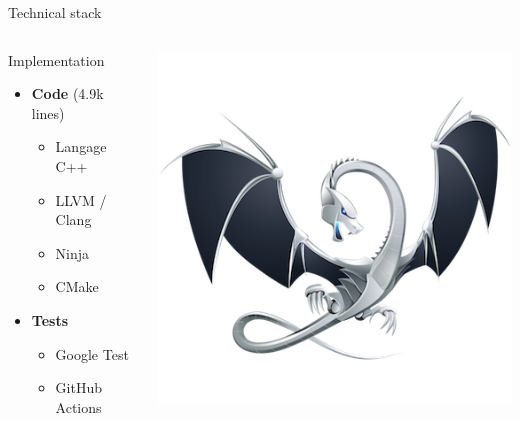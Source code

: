 \begin{frame}{Technical stack}
\begin{columns}
    \begin{column}{0.5\textwidth}
        Implementation
        \begin{itemize}
            \item \textbf{Code} (4.9k lines)
            \begin{itemize}
                \item Langage C++
                \item LLVM / Clang
                \item Ninja
                \item CMake
            \end{itemize}
            \item \textbf{Tests}
            \begin{itemize}
                \item Google Test
                \item GitHub Actions
            \end{itemize}
        \end{itemize}
    \end{column}
    \begin{column}{0.5\textwidth}
        \begin{center}
            
            \includegraphics[width=.4\textwidth]{./images/llvm-logo.png}


\end{center}
\end{column}
\end{columns}
\end{frame}
